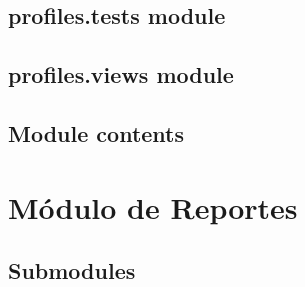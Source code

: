 \documentclass[letterpaper,10pt,spanish]{sphinxmanual}
\begin{document}
\subsection{profiles.tests module}
\label{profiles:profiles-tests-module}\label{profiles:module-profiles.tests}

\subsection{profiles.views module}
\label{profiles:profiles-views-module}\label{profiles:module-profiles.views}

\begin{fulllineitems}
\label{profiles:profiles.views.agrega_ganaderia_config}
\end{fulllineitems}


\begin{fulllineitems}
\label{profiles:profiles.views.home}
\end{fulllineitems}


\begin{fulllineitems}
\label{profiles:profiles.views.number_messages}
\end{fulllineitems}



\subsection{Module contents}
\label{profiles:module-contents}\label{profiles:module-profiles}

\section{Módulo de Reportes}
\label{reports:reports-package}\label{reports::doc}

\subsection{Submodules}
\label{reports:submodules}
\end{document}
